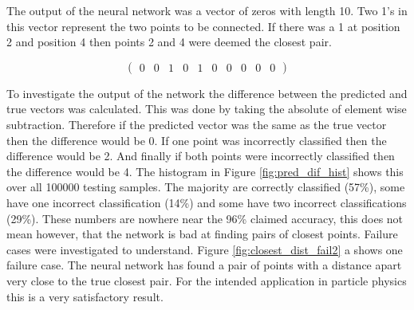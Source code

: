 The output of the neural network was a vector of zeros with length 10. Two 1's in this vector represent the two points to be connected. If there was a 1 at position 2 and position 4 then points 2 and 4 were deemed the closest pair.

\[
\begin{pmatrix}
0 & 0 & 1 & 0 & 1 & 0 & 0 & 0 & 0 & 0
\end{pmatrix}
\]

To investigate the output of the network the difference between the predicted and true vectors was calculated. This was done by taking the absolute of element wise subtraction. Therefore if the predicted vector was the same as the true vector then the difference would be 0. If one point was incorrectly classified then the difference would be 2. And finally if both points were incorrectly classified then the difference would be 4. The histogram in Figure \ref{fig:pred_dif_hist} shows this over all 100000 testing samples. The majority are correctly classified (57\%), some have one incorrect classification (14\%) and some have two incorrect classifications (29\%). These numbers are nowhere near the 96\% claimed accuracy, this does not mean however, that the network is bad at finding pairs of closest points. Failure cases were investigated to understand. Figure \ref{fig:closest_dist_fail2} a shows one failure case. The neural network has found a pair of points with a distance apart very close to the true closest pair. For the intended application in particle physics this is a very satisfactory result.



